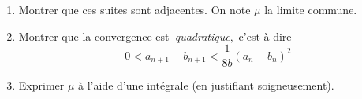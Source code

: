 \begin{enumerate}
\item  Montrer que ces suites sont adjacentes. On note $\mu $ la limite commune.

\item  Montrer que la convergence est\emph{\ quadratique}$,$ c'est {\`a} dire
\[
0<a_{n+1}-b_{n+1}<\frac{1}{8b}(a_{n}-b_{n})^{2}
\]

\item  Exprimer $\mu $ {\`a} l'aide d'une int{\'e}grale (en justifiant soigneusement).
\end{enumerate}
